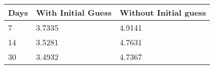 \begin{tabular}{lll}
Days & With Initial Guess & Without Initial guess \\ 
\hline 
7 & 3.7335 & 4.9141 \\ 
14 & 3.5281 & 4.7631 \\ 
30 & 3.4932 & 4.7367 \\ 
\hline 
\end{tabular}